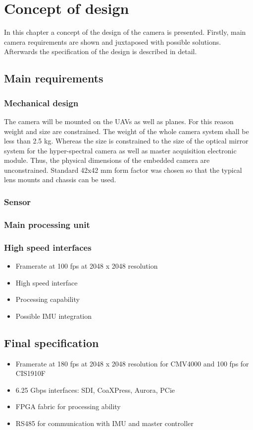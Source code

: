 \chapter{Concept of design}
In this chapter a concept of the design of the camera is presented. Firstly, main camera requirements are shown and juxtaposed with possible solutions. Afterwards the specification of the design is described in detail.

\section{Main requirements}

\subsection{Mechanical design}
The camera will be mounted on the UAVs as well as planes. For this reason weight and size are constrained. The weight of the whole camera system shall be less than 2.5 kg. Whereas the size is constrained to the size of the optical mirror system for the hyper-spectral camera as well as master acquisition electronic module. 
Thus, the physical dimensions of the embedded camera are unconstrained. Standard 42x42 mm form factor was chosen so that the typical lens mounts and chassis can be used. 

\subsection{Sensor}

\subsection{Main processing unit}

\subsection{High speed interfaces}


\begin{itemize}
\item Framerate at 100 fps at 2048 x 2048 resolution
\item High speed interface 
\item Processing capability
\item Possible IMU integration
\end{itemize}

\section{Final specification}

\begin{itemize}
\item Framerate at 180 fps at 2048 x 2048 resolution
for CMV4000 and 100 fps for CIS1910F
\item 6.25 Gbps interfaces: SDI, CoaXPress, Aurora, PCie
\item FPGA fabric for processing ability
\item RS485 for communication with IMU and master controller

\end{itemize}



